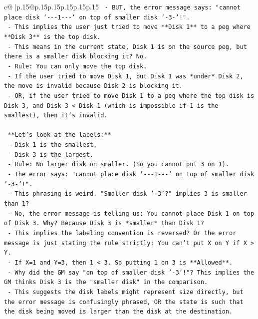 \documentclass{article}
\begin{document}
{\begin{supertabular}{c@{$\;$}|p{.15\linewidth}@{}p{.15\linewidth}p{.15\linewidth}p{.15\linewidth}p{.15\linewidth}p{.15\linewidth}}
{{{\texttt{   {-} BUT, the error message says: "cannot place disk '{-}{-}{-}1{-}{-}{-}' on top of smaller disk '{-}3{-}'!".} \\
\texttt{   {-} This implies the user just tried to move **Disk 1** to a peg where **Disk 3** is the top disk.} \\
\texttt{   {-} This means in the current state, Disk 1 is on the source peg, but there is a smaller disk blocking it? No.} \\
\texttt{   {-} Rule: You can only move the top disk.} \\
\texttt{   {-} If the user tried to move Disk 1, but Disk 1 was *under* Disk 2, the move is invalid because Disk 2 is blocking it.} \\
\texttt{   {-} OR, if the user tried to move Disk 1 to a peg where the top disk is Disk 3, and Disk 3 < Disk 1 (which is impossible if 1 is the smallest), then it's invalid.} \\
\\ 
\texttt{   **Let's look at the labels:**} \\
\texttt{   {-} Disk 1 is the smallest.} \\
\texttt{   {-} Disk 3 is the largest.} \\
\texttt{   {-} Rule: No larger disk on smaller. (So you cannot put 3 on 1).} \\
\texttt{   {-} The error says: "cannot place disk '{-}{-}{-}1{-}{-}{-}' on top of smaller disk '{-}3{-}'!".} \\
\texttt{   {-} This phrasing is weird. "Smaller disk '{-}3'?" implies 3 is smaller than 1?} \\
\texttt{   {-} No, the error message is telling us: You cannot place Disk 1 on top of Disk 3. Why? Because Disk 3 is *smaller* than Disk 1?} \\
\texttt{   {-} This implies the labeling convention is reversed? Or the error message is just stating the rule strictly: You can't put X on Y if X > Y.} \\
\texttt{   {-} If X=1 and Y=3, then 1 < 3. So putting 1 on 3 is **Allowed**.} \\
\texttt{   {-} Why did the GM say "on top of smaller disk '{-}3'!"? This implies the GM thinks Disk 3 is the "smaller disk" in the comparison.} \\
\texttt{   {-} This suggests the disk labels might represent size directly, but the error message is confusingly phrased, OR the state is such that the disk being moved is larger than the disk at the destination.} \\
}}}
\end{supertabular}}
\end{document}
